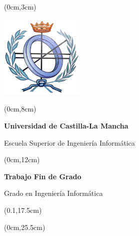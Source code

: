 %
% 
\pagestyle{empty}
\begin{titlepage}\null



\begin{textblock*}{\paperwidth}(0cm,3cm)
\begin{center}
\includegraphics[width=4cm]{figs/logoconciti.png}
\end{center}
\end{textblock*}


\begin{textblock*}{\paperwidth}(0cm,8cm) 
\begin{center}\doublespacing
{\fontsize{18pt}{4pt}\selectfont \textbf{Universidad de Castilla-La Mancha}}

{\fontsize{18pt}{4pt}\selectfont Escuela Superior de Ingeniería Informática}
\end{center}
\end{textblock*}


\begin{textblock*}{\paperwidth}(0cm,12cm) 
\begin{center}\doublespacing 
{\bf\fontsize{18pt}{4pt}\selectfont Trabajo Fin de Grado}

{\fontsize{18pt}{4pt}\selectfont Grado en Ingeniería Informática}

{\fontsize{18pt}{4pt}\selectfont \espec}
\end{center}
\end{textblock*}


\begin{textblock*}{0.8\paperwidth}(0.1\paperwidth,17.5cm) 
\begin{center}\doublespacing %
{\bf\fontsize{20pt}{4pt}\selectfont \titulo}

\vskip1cm
{\it \fontsize{18pt}{4pt}\selectfont \autor}
\end{center}
\end{textblock*}


\begin{textblock*}{\paperwidth}(0cm,25.5cm) 
\begin{center}
{\fontsize{14pt}{4pt}\selectfont \fecha}
\end{center}
\end{textblock*}
\end{titlepage}